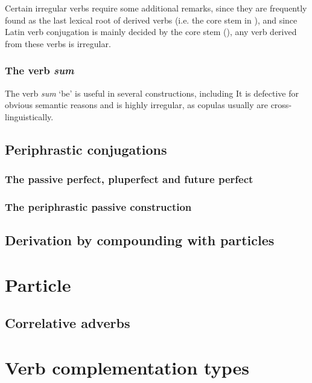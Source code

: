 \documentclass{article}
\newcommand*{\corpus}[1]{\emph{#1}}
\begin{document}
Certain irregular verbs require some additional remarks,
since they are frequently found as the last lexical root of derived verbs 
(i.e. the core stem in ),
and since Latin verb conjugation is mainly decided by the core stem (),
any verb derived from these verbs is irregular.

\subsubsection{The verb \corpus{sum}}\label{sec:sum-verb}

The verb \corpus{sum} `be' is useful in several constructions,
including %
It is defective for obvious semantic reasons
and is highly irregular,
as copulas usually are cross-linguistically.

\subsection{Periphrastic conjugations}

\subsubsection{The passive perfect, pluperfect and future perfect}

\subsubsection{The periphrastic passive construction}\label{sec:passive-periphrastic}

\subsection{Derivation by compounding with particles}

\section{Particle}

\subsection{Correlative adverbs}\label{sec:correlative-advs}

\section{Verb complementation types}\label{sec:verb-complement}
\end{document}
